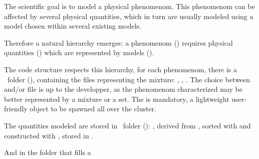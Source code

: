 The scientific goal is to model a physical phenomenom. This
phenomenom can be affected by several physical quantities, which
in turn are usually modeled using a model chosen within several
existing models.

Therefore a natural hierarchy emerges:
a phenomenom () requires physical quantities
() which are
represented by models ().

The code structure respects this hierarchy, for each
phenomenom, there is a \phenomenom\ folder (),
containing the files representing the mixture: 
,
,
.
The choice between  and/or 
file is up to the developper, as the phenomenom characterized
may be better represented by a mixture or a set. The
 is mandatory, a lightweight user-friendly object
to be spawned all over the cluster.

The quantities modeled are stored in \quantity\ folder ():
, derived from
, sorted with
 and constructed with
, stored in
.

And in the  folder
 that fills a 


